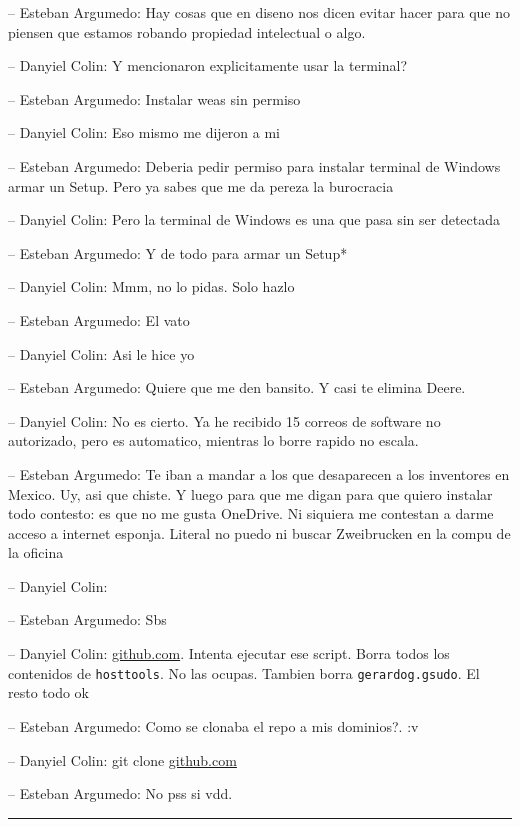 -- Esteban Argumedo: Hay cosas que en diseno nos dicen evitar hacer para
que no piensen que estamos robando propiedad intelectual o algo.

-- Danyiel Colin: Y mencionaron explicitamente usar la terminal?

-- Esteban Argumedo: Instalar weas sin permiso

-- Danyiel Colin: Eso mismo me dijeron a mi

-- Esteban Argumedo: Deberia pedir permiso para instalar terminal de
Windows armar un Setup. Pero ya sabes que me da pereza la burocracia

-- Danyiel Colin: Pero la terminal de Windows es una que pasa sin ser
detectada

-- Esteban Argumedo: Y de todo para armar un Setup*

-- Danyiel Colin: Mmm, no lo pidas. Solo hazlo

-- Esteban Argumedo: El vato

-- Danyiel Colin: Asi le hice yo

-- Esteban Argumedo: Quiere que me den bansito. Y casi te elimina Deere.

-- Danyiel Colin: No es cierto. Ya he recibido 15 correos de software no
autorizado, pero es automatico, mientras lo borre rapido no escala.

-- Esteban Argumedo: Te iban a mandar a los que desaparecen a los
inventores en Mexico. Uy, asi que chiste. Y luego para que me digan para
que quiero instalar todo contesto: es que no me gusta OneDrive. Ni
siquiera me contestan a darme acceso a internet esponja. Literal no
puedo ni buscar Zweibrucken en la compu de la oficina

-- Danyiel Colin:

-- Esteban Argumedo: Sbs

-- Danyiel Colin:
\href{https://github.com/DanEscher98/EmbeddedScripts/blob/main/Scripts/VM-Machines/jdubuntu/Win-Setup.ps1}{github.com}.
Intenta ejecutar ese script. Borra todos los contenidos de
\texttt{hosttools}. No las ocupas. Tambien borra
\texttt{gerardog.gsudo}. El resto todo ok

-- Esteban Argumedo: Como se clonaba el repo a mis dominios?. :v

-- Danyiel Colin: git clone \href{https://github.com/etc}{github.com}

-- Esteban Argumedo: No pss si vdd.

\begin{center}\rule{0.5\linewidth}{0.5pt}\end{center}

